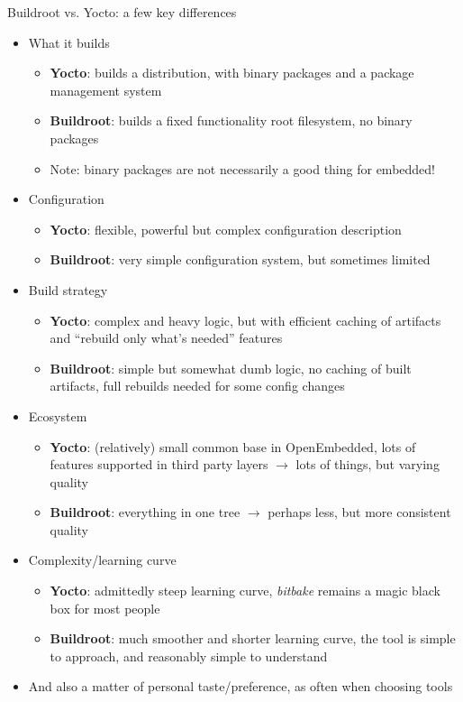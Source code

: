 \begin{frame}{Buildroot vs. Yocto: a few key differences}
  \begin{itemize}
  \item What it builds
     {
      \begin{itemize}
      \item {\bf Yocto}: builds a distribution, with binary packages and a
        package management system
      \item {\bf Buildroot}: builds a fixed functionality root
        filesystem, no binary packages
      \item Note: binary packages are not necessarily a good thing for
        embedded!
      \end{itemize}
    }
    \pause
  \item Configuration
     {
      \begin{itemize}
      \item {\bf Yocto}: flexible, powerful but complex configuration
        description
      \item {\bf Buildroot}: very simple configuration system, but
        sometimes limited
      \end{itemize}
    }
    \pause
  \item Build strategy
     {
      \begin{itemize}
      \item {\bf Yocto}: complex and heavy logic, but with efficient
        caching of artifacts and ``rebuild only what's needed'' features
      \item {\bf Buildroot}: simple but somewhat dumb logic, no caching
        of built artifacts, full rebuilds needed for some config changes
      \end{itemize}
    }
    \pause
  \item Ecosystem
     {
      \begin{itemize}
      \item {\bf Yocto}: (relatively) small common base in OpenEmbedded,
        lots of features supported in third party layers $\rightarrow$
        lots of things, but varying quality
      \item {\bf Buildroot}: everything in one tree $\rightarrow$
        perhaps less, but more consistent quality
      \end{itemize}
    }
    \pause
  \item Complexity/learning curve
     {
      \begin{itemize}
      \item {\bf Yocto}: admittedly steep learning curve, {\em bitbake}
        remains a magic black box for most people
      \item {\bf Buildroot}: much smoother and shorter learning curve,
        the tool is simple to approach, and reasonably simple to
        understand
      \end{itemize}
    }
    \pause
  \item And also a matter of personal taste/preference, as often when
    choosing tools
  \end{itemize}
\end{frame}

